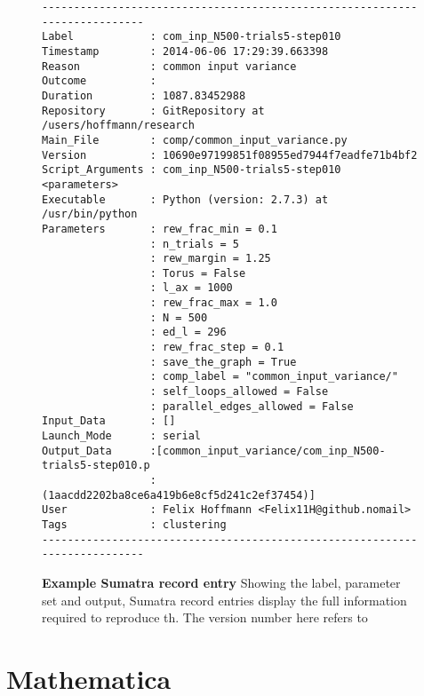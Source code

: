 \begin{figure}[H]
  \scriptsize
\hspace{0.4cm}
\begin{minipage}{0.7\linewidth}
\begin{verbatim}
---------------------------------------------------------------------------
Label            : com_inp_N500-trials5-step010
Timestamp        : 2014-06-06 17:29:39.663398
Reason           : common input variance
Outcome          : 
Duration         : 1087.83452988
Repository       : GitRepository at /users/hoffmann/research
Main_File        : comp/common_input_variance.py
Version          : 10690e97199851f08955ed7944f7eadfe71b4bf2
Script_Arguments : com_inp_N500-trials5-step010 <parameters>
Executable       : Python (version: 2.7.3) at /usr/bin/python
Parameters       : rew_frac_min = 0.1
                 : n_trials = 5
                 : rew_margin = 1.25
                 : Torus = False
                 : l_ax = 1000
                 : rew_frac_max = 1.0
                 : N = 500
                 : ed_l = 296
                 : rew_frac_step = 0.1
                 : save_the_graph = True
                 : comp_label = "common_input_variance/"
                 : self_loops_allowed = False
                 : parallel_edges_allowed = False
Input_Data       : []
Launch_Mode      : serial
Output_Data      :[common_input_variance/com_inp_N500-trials5-step010.p
                 : (1aacdd2202ba8ce6a419b6e8cf5d241c2ef37454)]
User             : Felix Hoffmann <Felix11H@github.nomail>
Tags             : clustering
---------------------------------------------------------------------------
\end{verbatim}
\end{minipage}
\normalsize
\captionsetup{skip=18pt}
\caption{\label{fig:sumatra}%
  \textbf{Example Sumatra record entry} Showing the label, parameter
  set and output, Sumatra record entries display the full information
  required to reproduce th. The version number here refers to }
\end{figure}






\section{Mathematica}

